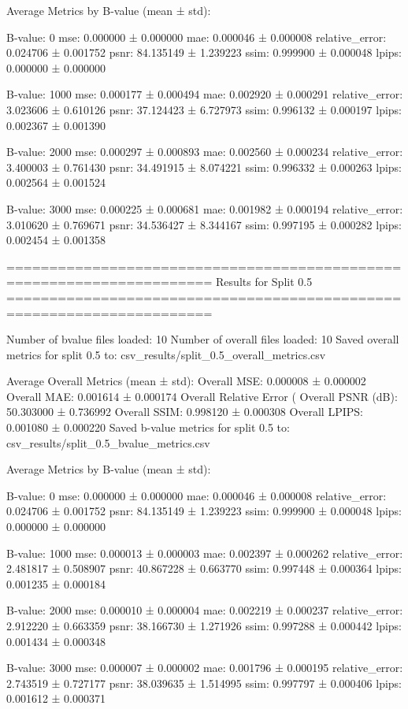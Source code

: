 Average Metrics by B-value (mean ± std):

B-value: 0
mse: 0.000000 ± 0.000000
mae: 0.000046 ± 0.000008
relative_error: 0.024706 ± 0.001752
psnr: 84.135149 ± 1.239223
ssim: 0.999900 ± 0.000048
lpips: 0.000000 ± 0.000000

B-value: 1000
mse: 0.000177 ± 0.000494
mae: 0.002920 ± 0.000291
relative_error: 3.023606 ± 0.610126
psnr: 37.124423 ± 6.727973
ssim: 0.996132 ± 0.000197
lpips: 0.002367 ± 0.001390

B-value: 2000
mse: 0.000297 ± 0.000893
mae: 0.002560 ± 0.000234
relative_error: 3.400003 ± 0.761430
psnr: 34.491915 ± 8.074221
ssim: 0.996332 ± 0.000263
lpips: 0.002564 ± 0.001524

B-value: 3000
mse: 0.000225 ± 0.000681
mae: 0.001982 ± 0.000194
relative_error: 3.010620 ± 0.769671
psnr: 34.536427 ± 8.344167
ssim: 0.997195 ± 0.000282
lpips: 0.002454 ± 0.001358

======================================================================
Results for Split 0.5
======================================================================

Number of bvalue files loaded: 10
Number of overall files loaded: 10
Saved overall metrics for split 0.5 to: csv_results/split_0.5_overall_metrics.csv

Average Overall Metrics (mean ± std):
Overall MSE: 0.000008 ± 0.000002
Overall MAE: 0.001614 ± 0.000174
Overall Relative Error (%
Overall PSNR (dB): 50.303000 ± 0.736992
Overall SSIM: 0.998120 ± 0.000308
Overall LPIPS: 0.001080 ± 0.000220
Saved b-value metrics for split 0.5 to: csv_results/split_0.5_bvalue_metrics.csv

Average Metrics by B-value (mean ± std):

B-value: 0
mse: 0.000000 ± 0.000000
mae: 0.000046 ± 0.000008
relative_error: 0.024706 ± 0.001752
psnr: 84.135149 ± 1.239223
ssim: 0.999900 ± 0.000048
lpips: 0.000000 ± 0.000000

B-value: 1000
mse: 0.000013 ± 0.000003
mae: 0.002397 ± 0.000262
relative_error: 2.481817 ± 0.508907
psnr: 40.867228 ± 0.663770
ssim: 0.997448 ± 0.000364
lpips: 0.001235 ± 0.000184

B-value: 2000
mse: 0.000010 ± 0.000004
mae: 0.002219 ± 0.000237
relative_error: 2.912220 ± 0.663359
psnr: 38.166730 ± 1.271926
ssim: 0.997288 ± 0.000442
lpips: 0.001434 ± 0.000348

B-value: 3000
mse: 0.000007 ± 0.000002
mae: 0.001796 ± 0.000195
relative_error: 2.743519 ± 0.727177
psnr: 38.039635 ± 1.514995
ssim: 0.997797 ± 0.000406
lpips: 0.001612 ± 0.000371

